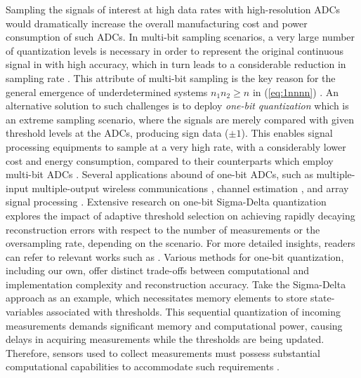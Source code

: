 \documentclass[12pt,draftcls,onecolumn]{IEEEtran}
\begin{document}
Sampling the signals of interest at high data rates with high-resolution ADCs would dramatically increase the overall manufacturing cost and power consumption of such ADCs. In multi-bit sampling scenarios, a very large number of quantization levels is necessary in order to represent the original continuous signal in with high accuracy, which in turn leads to a considerable reduction in sampling rate \cite{boufounos2015quantization,eamaz2021modified}. This attribute of multi-bit sampling is the key reason for the general emergence of underdetermined systems $n_{1}n_{2}\geq n$ in (\ref{eq:1nnnn}) \cite{candes2013phaselift,candes2015phase,eamaz2022phase}. An alternative solution to such challenges is to deploy \emph{one-bit quantization} which is an extreme sampling scenario, where the signals are merely compared with given threshold levels at the ADCs, producing sign data ($\pm1$). This enables signal processing equipments to sample at a very high rate, with a considerably lower cost and energy consumption, compared to their counterparts which employ multi-bit ADCs \cite{mezghani2018blind,eamaz2021modified,sedighi2020one,sedighi2021performance}. Several applications abound of one-bit ADCs, such as multiple-input multiple-output wireless communications \cite{kong2018multipair,mezghani2018blind,maly2022new}, channel estimation \cite{li2017channel,choi2016near}, and array signal processing \cite{liu2017one}. Extensive research on one-bit Sigma-Delta quantization explores the impact of adaptive threshold selection on achieving rapidly decaying reconstruction errors with respect to the number of measurements or the oversampling rate, depending on the scenario. For more detailed insights, readers can refer to relevant works such as \cite{gunturk2003one,deift2011optimal,benedetto2006sigma}. Various methods for one-bit quantization, including our own, offer distinct trade-offs between computational and implementation complexity and reconstruction accuracy. Take the Sigma-Delta approach as an example, which necessitates memory elements to store state-variables associated with thresholds. This sequential quantization of incoming measurements demands significant memory and computational power, causing delays in acquiring measurements while the thresholds are being updated. Therefore, sensors used to collect measurements must possess substantial computational capabilities to accommodate such requirements \cite{knudson2016one,boufounos2015quantization}. 
\end{document}
